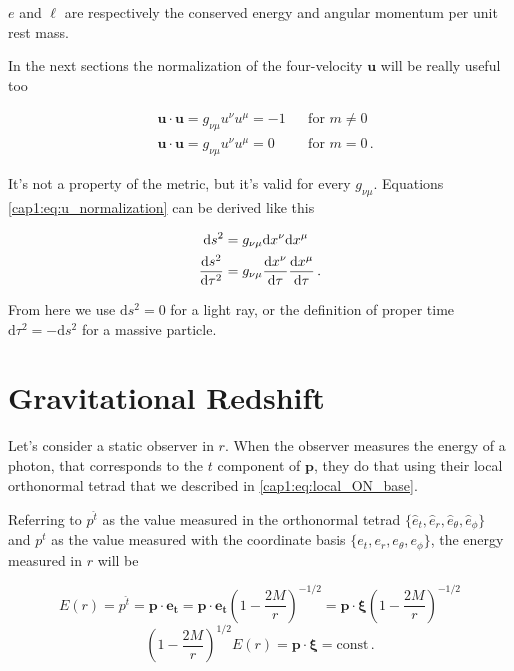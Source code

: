 $e$ and $\ell$ are respectively the conserved energy and angular momentum per
unit
rest mass.

In the next sections the normalization of the four-velocity $\mathbf u$ will be
really useful too

\begin{subequations}
    \begin{align}
        &\mathbf{u \cdot u} = g_{\nu \mu} u^\nu u^\mu = -1 
        &&\text{for } m \neq 0 \label{cap1:eq:u_normalization_mass} \\
        &\mathbf{u \cdot u} = g_{\nu \mu} u^\nu u^\mu = 0 
        &&\text{for } m = 0 \label{cap1:eq:u_normalization_light} \, .
    \end{align}
    \label{cap1:eq:u_normalization}
\end{subequations}

It's not a property of the metric, but it's valid for every $g_{\nu \mu}$.
Equations \ref{cap1:eq:u_normalization} can be derived like this

\begin{align*}
    \mathrm{d}s^2 &= g_{\nu \mu} \mathrm{d}x^\nu \mathrm{d}x^\mu \\
    \dv{s^2}{\tau^2} &= g_{\nu \mu} \dv{x^\nu}{\tau} \dv{x^\mu}{\tau} \, .
\end{align*}

From here we use $\mathrm{d}s^2 = 0$ for a light ray, or the definition of
proper time $\mathrm{d}\tau^2 = - \mathrm{d}s^2$ for a massive particle.


\section{Gravitational Redshift}

Let's consider a static observer in $r$.
When the observer measures the energy of a photon, that corresponds to the $t$
component of $\mathbf{p}$, they do that using their local orthonormal tetrad
that we described in \ref{cap1:eq:local_ON_base}.

Referring to $p^{\hat t}$ as the value measured in the orthonormal tetrad
$\{\hat e_t, \hat e_r, \hat e_\theta, \hat e_\phi \}$ and
$p^t$ as the value measured with the coordinate basis
$\{e_{t}, e_{r}, e_{\theta}, e_{\phi} \}$, the energy measured in $r$ will be

\begin{equation*}
    E(r) = p^{\hat t} = \mathbf{p \cdot \hat e_t}
    = \mathbf{p \cdot e_t} \left(1 - \frac{2M}{r} \right)^{-1/2}
    = \mathbf{p \cdot \xi} \left(1 - \frac{2M}{r} \right)^{-1/2}
\end{equation*}
\begin{equation}
    \left(1 - \frac{2M}{r} \right)^{1/2} E(r) = \mathbf{p \cdot \xi}
    = \text{const} \, .
    \label{cap1:eq:photon_energy1}
\end{equation}

